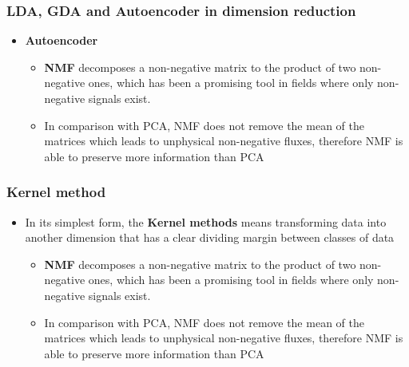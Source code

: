 \documentclass[11pt]{beamer}
\begin{document}
\begin{frame}
\frametitle{LDA, GDA and Autoencoder in dimension reduction}
\begin{itemize}
	\item \textbf{Autoencoder}
	\begin{itemize}
		\item \textbf{NMF} decomposes a non-negative matrix to the product of two non-negative ones, which has been a promising tool in fields where only non-negative signals exist.
		\item In comparison with PCA, NMF does not remove the mean of the matrices which leads to unphysical non-negative fluxes, therefore NMF is able to preserve more information than PCA
	\end{itemize}
\end{itemize}
\end{frame}

\begin{frame}
\frametitle{Kernel method}
\begin{itemize}
	\item In its simplest form, the \textbf{Kernel methods} means transforming data into another dimension that has a clear dividing margin between classes of data 
	\begin{itemize}
		\item \textbf{NMF} decomposes a non-negative matrix to the product of two non-negative ones, which has been a promising tool in fields where only non-negative signals exist.
		\item In comparison with PCA, NMF does not remove the mean of the matrices which leads to unphysical non-negative fluxes, therefore NMF is able to preserve more information than PCA
	\end{itemize}
\end{itemize}
\end{frame}
\end{document}
